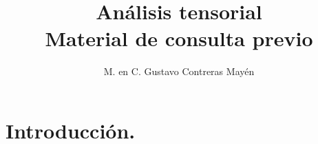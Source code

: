 
\title{Análisis tensorial \\ \large{Material de consulta previo}\vspace{-3ex}}
\author{M. en C. Gustavo Contreras Mayén}
\date{ }




\vspace{-4cm}
\maketitle
\fontsize{14}{14}\selectfont
\tableofcontents
\newpage

\section{Introducción.}

